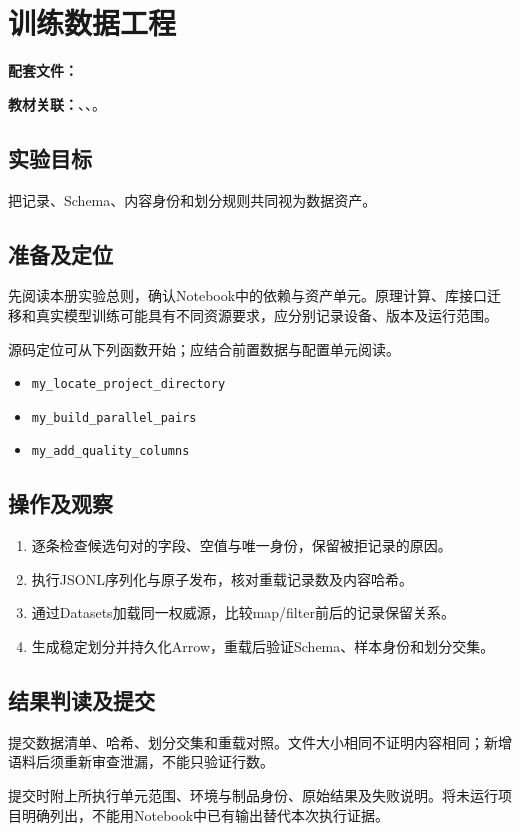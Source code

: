 \chapter{训练数据工程}
\label{lab:20_dataset}

\noindent\textbf{配套文件：}\par
\noindent\textbf{教材关联：}、、。

\section*{实验目标}
把记录、Schema、内容身份和划分规则共同视为数据资产。

\section*{准备及定位}
先阅读本册实验总则，确认Notebook中的依赖与资产单元。原理计算、库接口迁移和真实模型训练可能具有不同资源要求，应分别记录设备、版本及运行范围。

源码定位可从下列函数开始；应结合前置数据与配置单元阅读。
\begin{itemize}
\item \texttt{my\_locate\_project\_directory}
\item \texttt{my\_build\_parallel\_pairs}
\item \texttt{my\_add\_quality\_columns}
\end{itemize}

\section*{操作及观察}
\begin{enumerate}
\item 逐条检查候选句对的字段、空值与唯一身份，保留被拒记录的原因。
\item 执行JSONL序列化与原子发布，核对重载记录数及内容哈希。
\item 通过Datasets加载同一权威源，比较map/filter前后的记录保留关系。
\item 生成稳定划分并持久化Arrow，重载后验证Schema、样本身份和划分交集。
\end{enumerate}

\section*{结果判读及提交}
提交数据清单、哈希、划分交集和重载对照。文件大小相同不证明内容相同；新增语料后须重新审查泄漏，不能只验证行数。

提交时附上所执行单元范围、环境与制品身份、原始结果及失败说明。将未运行项目明确列出，不能用Notebook中已有输出替代本次执行证据。
